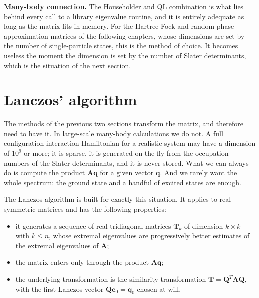 \begin{notebox}
\textbf{Many-body connection.} The Householder and QL combination is what
lies behind every call to a library eigenvalue routine, and it is entirely
adequate as long as the matrix fits in memory.  For the Hartree-Fock and
random-phase-approximation matrices of the following chapters, whose
dimensions are set by the number of single-particle states, this is the
method of choice.  It becomes useless the moment the dimension is set by the
number of Slater determinants, which is the situation of the next section.
\end{notebox}

\section{Lanczos' algorithm}
\label{sec:lanczos}

The methods of the previous two sections transform the matrix, and therefore
need to have it.  In large-scale many-body calculations we do not.  A
full configuration-interaction Hamiltonian for a realistic system may have a
dimension of $10^9$ or more; it is sparse, it is generated on the fly from the
occupation numbers of the Slater determinants, and it is never stored.  What
we can always do is compute the product $\bm{A}\bm{q}$ for a given vector
$\bm{q}$.  And we rarely want the whole spectrum: the ground state and a
handful of excited states are enough.

The Lanczos algorithm is built for exactly this situation.  It applies to real
symmetric matrices and has the following properties:
\begin{itemize}
  \item it generates a sequence of real tridiagonal matrices $\bm{T}_k$ of
        dimension $k\times k$ with $k\le n$, whose extremal eigenvalues are
        progressively better estimates of the extremal eigenvalues of
        $\bm{A}$;
  \item the matrix enters only through the product $\bm{A}\bm{q}$;
  \item the underlying transformation is the similarity transformation
        $\bm{T}=\bm{Q}^{T}\bm{A}\bm{Q}$, with the first Lanczos vector
        $\bm{Q}\bm{e}_0=\bm{q}_0$ chosen at will.
\end{itemize}

